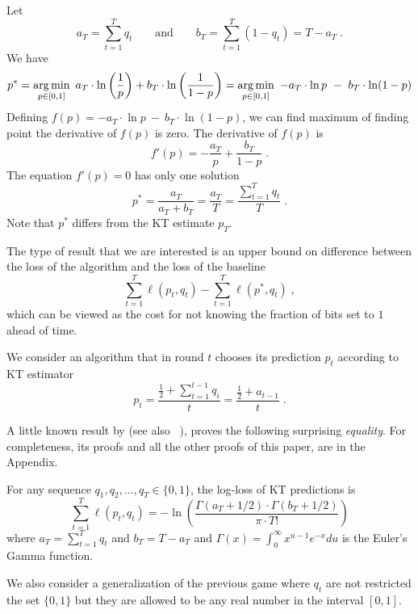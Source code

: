 Let
$$
a_T = \sum_{t=1}^T q_t \qquad \text{and} \qquad b_T = \sum_{t=1}^T (1 - q_t) = T - a_T \; .
$$
We have
\begin{align*}
p^*
= \operatorname*{arg\,min}_{p \in [0,1]} \ a_T \cdot  \ln \left( \frac{1}{p} \right) + b_T \cdot \ln \left( \frac{1}{1-p} \right)
= \operatorname*{arg\,min}_{p \in [0,1]} \ - a_T \cdot  \ln p \ - \  b_T \cdot \ln (1-p)
\end{align*}
Defining $f(p) = - a_T \cdot  \ln p \ - \  b_T \cdot \ln(1-p)$, we can find maximum of
finding point the derivative of $f(p)$ is zero. The derivative of $f(p)$ is
$$
f'(p) = - \frac{a_T}{p} + \frac{b_T}{1-p} \; .
$$
The equation $f'(p) = 0$ has only one solution
$$
p^* = \frac{a_T}{a_T + b_T} = \frac{a_T}{T} = \frac{\sum_{t=1}^T q_t}{T} \; .
$$
Note that $p^*$ differs from the KT estimate $p_T$.

The type of result that we are interested is an upper bound on difference
between the loss of the algorithm and the loss of the baseline
$$
\sum_{t=1}^T \ell(p_t, q_t) - \sum_{t=1}^T \ell(p^*, q_t) \; ,
$$
which can be viewed as the cost for not knowing the fraction of bits set to $1$
ahead of time.


We consider an algorithm that in round $t$ chooses its prediction $p_t$
according to KT estimator
$$
p_t = \frac{\frac{1}{2} + \sum_{t=1}^{t-1} q_i}{t} = \frac{\frac{1}{2} + a_{t-1}}{t} \; .
$$

A little known result by \citep{KrichevskyT81} (see also ~\cite{Cesa-BianchiL06}), proves the following surprising \emph{equality}.
For completeness, its proofs and all the other proofs of this paper, are in the Appendix.
\begin{lemma}
\label{lemma:kt}
For any sequence $q_1, q_2, \dots, q_T \in \{0,1\}$, the log-loss of KT
predictions is
$$
\sum_{t=1}^T \ell(p_t, q_t) =  - \ln \left( \frac{\Gamma(a_T + 1/2) \cdot \Gamma(b_T + 1/2)}{\pi \cdot T!} \right)
$$
where $a_T = \sum_{t=1}^T q_t$ and $b_T = T - a_T$ and $\Gamma(x) =
\int_0^\infty x^{u-1} e^{-x} du$ is the Euler's Gamma function.
\end{lemma}

We also consider a generalization of the previous game where $q_t$ are not
restricted the set $\{0,1\}$ but they are allowed to be any real number in the
interval $[0,1]$.

